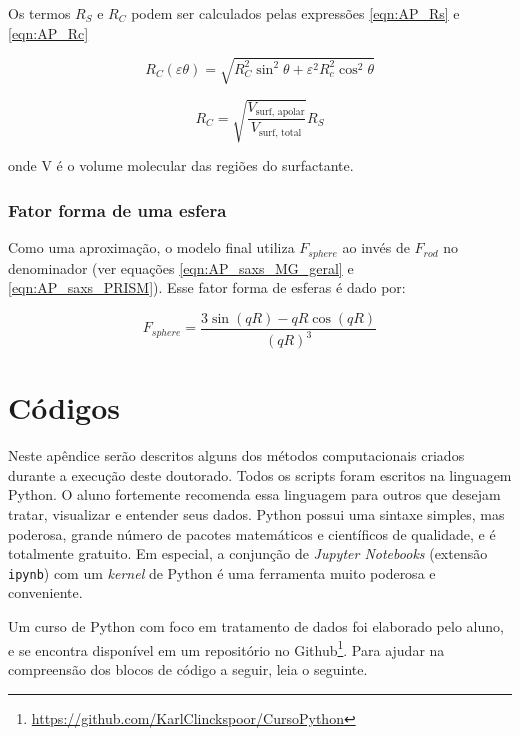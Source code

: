 \begin{apendicesenv}
Os termos $R_S$ e $R_C$ podem ser calculados pelas expressões \ref{eqn:AP_Rs} e \ref{eqn:AP_Rc}

\begin{equation}
R_C(\varepsilon\theta) = \sqrt{R_C^2\sin^2\theta + \varepsilon^2R_c^2\cos^2\theta}
\label{eqn:AP_Rc}
\end{equation}

\begin{equation}
R_C = \sqrt{\frac{V_{\text{surf, apolar}}}{V_{\text{surf, total}}}}R_S
\label{eqn:AP_Rs}
\end{equation}

\noindent onde V é o volume molecular das regiões do surfactante.

\subsection{Fator forma de uma esfera}
Como uma aproximação, o modelo final utiliza $F_{sphere}$ ao invés de $F_{rod}$ no denominador (ver equações \ref{eqn:AP_saxs_MG_geral} e \ref{eqn:AP_saxs_PRISM}). Esse fator forma de esferas é dado por:

\begin{equation}
	F_{sphere} = \dfrac{3\sin(qR) - qR\cos(qR)}{(qR)^3}
	\label{eqn:AP_Fsphere}
\end{equation}

\chapter{Códigos}

	Neste apêndice serão descritos alguns dos métodos computacionais criados durante a execução deste doutorado. Todos os scripts foram escritos na linguagem Python. O aluno fortemente recomenda essa linguagem para outros que desejam tratar, visualizar e entender seus dados. Python possui uma sintaxe simples, mas poderosa, grande número de pacotes matemáticos e científicos de qualidade, e é totalmente gratuito. Em especial, a conjunção de \emph{Jupyter Notebooks} (extensão \texttt{ipynb}) com um \emph{kernel} de Python é uma ferramenta muito poderosa e conveniente.
	
	Um curso de Python com foco em tratamento de dados foi elaborado pelo aluno, e se encontra disponível em um repositório no Github\footnote{\href{https://github.com/KarlClinckspoor/CursoPython}{https://github.com/KarlClinckspoor/CursoPython}}. Para ajudar na compreensão dos blocos de código a seguir, leia o seguinte.
	

\end{apendicesenv}

